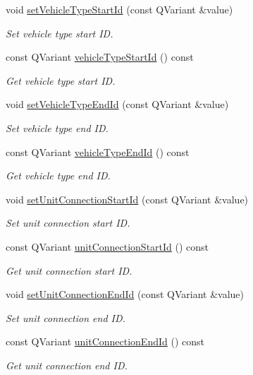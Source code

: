 \begin{DoxyCompactItemize}
\item 
void \hyperlink{classmdt_cl_vehicle_type_link_data_a2288aa6b4d810dcb386cb59366b45640}{set\-Vehicle\-Type\-Start\-Id} (const Q\-Variant \&value)
\begin{DoxyCompactList}\small\item\em Set vehicle type start I\-D. \end{DoxyCompactList}\item 
const Q\-Variant \hyperlink{classmdt_cl_vehicle_type_link_data_afd0e8b34211b5ba7060f9646355272d7}{vehicle\-Type\-Start\-Id} () const 
\begin{DoxyCompactList}\small\item\em Get vehicle type start I\-D. \end{DoxyCompactList}\item 
void \hyperlink{classmdt_cl_vehicle_type_link_data_ae3b19188162a227df93d5b9004d023b5}{set\-Vehicle\-Type\-End\-Id} (const Q\-Variant \&value)
\begin{DoxyCompactList}\small\item\em Set vehicle type end I\-D. \end{DoxyCompactList}\item 
const Q\-Variant \hyperlink{classmdt_cl_vehicle_type_link_data_a447eb17010f24f3c3c86bb80794cd824}{vehicle\-Type\-End\-Id} () const 
\begin{DoxyCompactList}\small\item\em Get vehicle type end I\-D. \end{DoxyCompactList}\item 
void \hyperlink{classmdt_cl_vehicle_type_link_data_a9e48be4f6bd5f153f8256481241bef37}{set\-Unit\-Connection\-Start\-Id} (const Q\-Variant \&value)
\begin{DoxyCompactList}\small\item\em Set unit connection start I\-D. \end{DoxyCompactList}\item 
const Q\-Variant \hyperlink{classmdt_cl_vehicle_type_link_data_a3a008da136674084334cf607e6d94183}{unit\-Connection\-Start\-Id} () const 
\begin{DoxyCompactList}\small\item\em Get unit connection start I\-D. \end{DoxyCompactList}\item 
void \hyperlink{classmdt_cl_vehicle_type_link_data_ad5538a51c2f02778ad01936fd7e5ca4a}{set\-Unit\-Connection\-End\-Id} (const Q\-Variant \&value)
\begin{DoxyCompactList}\small\item\em Set unit connection end I\-D. \end{DoxyCompactList}\item 
const Q\-Variant \hyperlink{classmdt_cl_vehicle_type_link_data_a26d6890a36fe9c3d827362285c5eca22}{unit\-Connection\-End\-Id} () const 
\begin{DoxyCompactList}\small\item\em Get unit connection end I\-D. \end{DoxyCompactList}\end{DoxyCompactItemize}



